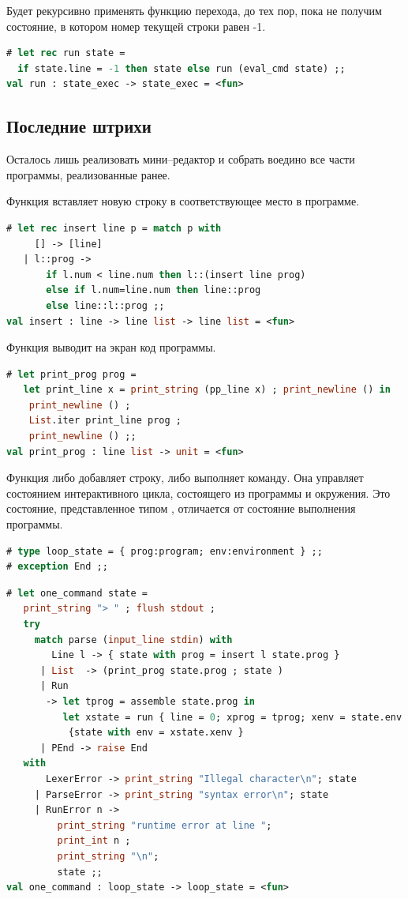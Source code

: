 Будет рекурсивно применять функцию перехода, до тех пор, пока не получим 
состояние, в котором номер текущей строки равен -1.

\begin{lstlisting}[language=OCaml]
# let rec run state = 
  if state.line = -1 then state else run (eval_cmd state) ;;
val run : state_exec -> state_exec = <fun>
\end{lstlisting}

\subsection{Последние штрихи}
\label{subsec:finishing_touches}

Осталось лишь реализовать мини–редактор и собрать воедино все части программы, 
реализованные ранее.

Функция  вставляет новую строку в соответствующее место в 
программе.

\begin{lstlisting}[language=OCaml]
# let rec insert line p = match p with  
     [] -> [line]
   | l::prog -> 
       if l.num < line.num then l::(insert line prog)
       else if l.num=line.num then line::prog
       else line::l::prog ;;
val insert : line -> line list -> line list = <fun>
\end{lstlisting}

Функция  выводит на экран код программы. 

\begin{lstlisting}[language=OCaml]
# let print_prog prog = 
   let print_line x = print_string (pp_line x) ; print_newline () in
    print_newline () ;
    List.iter print_line prog ;
    print_newline () ;;
val print_prog : line list -> unit = <fun>
\end{lstlisting}

Функция  либо добавляет строку, либо выполняет команду. Она 
управляет состоянием интерактивного цикла, состоящего из программы и окружения. 
Это состояние, представленное типом , отличается от состояние 
выполнения программы.

\begin{lstlisting}[language=OCaml]
# type loop_state = { prog:program; env:environment } ;;
# exception End ;;
\end{lstlisting}

\begin{lstlisting}[language=OCaml]
# let one_command state =
   print_string "> " ; flush stdout ;
   try 
     match parse (input_line stdin) with 
        Line l -> { state with prog = insert l state.prog }
      | List  -> (print_prog state.prog ; state )
      | Run 
       -> let tprog = assemble state.prog in
          let xstate = run { line = 0; xprog = tprog; xenv = state.env } in
           {state with env = xstate.xenv }
      | PEnd -> raise End
   with 
       LexerError -> print_string "Illegal character\n"; state 
     | ParseError -> print_string "syntax error\n"; state 
     | RunError n -> 
         print_string "runtime error at line ";
         print_int n ;
         print_string "\n";  
         state ;;
val one_command : loop_state -> loop_state = <fun>
\end{lstlisting}

